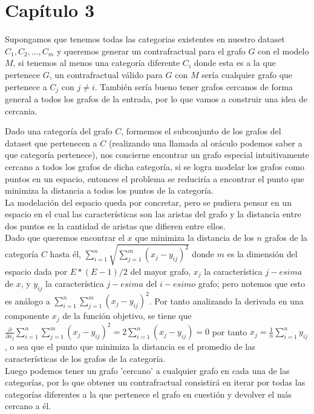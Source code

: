 \documentclass[11pt,letterpaper]{report} \usepackage[utf8]{inputenc} \usepackage[spanish]{babel}
\begin{document}
\chapter{Capítulo 3}

Supongamos que tenemos todas las categorias existentes en nuestro dataset $C_1, C_2, ..., C_m$ y queremos generar un contrafractual para el grafo $G$ con el modelo $M$, si tenemos al menos una categor\'ia diferente $C_i$ donde esta es a la que pertenece $G$, un contrafractual v\'alido para $G$ con $M$ ser\'ia cualquier grafo que pertenece a $C_j$ con $j \ne i$. Tambi\'en ser\'ia bueno tener grafos cercanos de forma general a todos los grafos de la entrada, por lo que vamos a construir una idea de cercania.

Dado una categor\'ia del grafo $C$, formemos el subconjunto de los grafos del dataset que pertenecen a $C$ (realizando una llamada al or\'aculo podemos saber a que categor\'ia pertenece), nos concierne encontrar un grafo especial intuitivamente cercano a todos los grafos de dicha categor\'ia, si se logra modelar los grafos como puntos en un espacio, entonces el problema se reducir\'ia a encontrar el punto que minimiza la distancia a todos los puntos de la categor\'ia. \\

La modelaci\'on del espacio queda por concretar, pero se pudiera pensar en un espacio en el cual las caracter\'isticas son las aristas del grafo y la distancia entre dos puntos es la cantidad de aristas que difieren entre ellos.\\

Dado que queremos encontrar el $x$ que minimiza la distancia de los $n$ grafos de la categor\'ia $C$ hasta \'el,  $\sum_{i=1}^{n} \sqrt{ \sum_{j=1}^{m} (x_j-y_{ij})^2 }$ donde $m$ es la dimensi\'on del espacio dada por $E*(E-1)/2$ del mayor grafo, $x_j$ la caracter\'istica $j-esima$ de $x$, y $y_{ij}$ la caracter\'istica $j-esima$ del $i-esimo$ grafo; pero notemos que esto es an\'alogo a $\sum_{i=1}^{n} \sum_{j=1}^{m} (x_j-y_{ij})^2$. Por tanto analizando la derivada en una componente $x_j$ de la funci\'on objetivo, se tiene que $\frac{\partial}{\partial x_j} \sum_{i=1}^{n} \sum_{j=1}^{m} (x_j-y_{ij})^2 = 2 \sum_{i=1}^{n} (x_j-y_{ij}) = 0$ por tanto $x_j = \frac{1}{n} \sum_{i=1}^{n} y_{ij}$, o sea que el punto que minimiza la distancia es el promedio de las caracter\'isticas de los grafos de la categor\'ia.\\

Luego podemos tener un grafo 'cercano' a cualquier grafo en cada una de las categor\'ias, por lo que obtener un contrafractual consistir\'a en iterar por todas las categor\'ias diferentes a la que pertenece el grafo en cuesti\'on y devolver el m\'as cercano a \'el.



\end{document}
